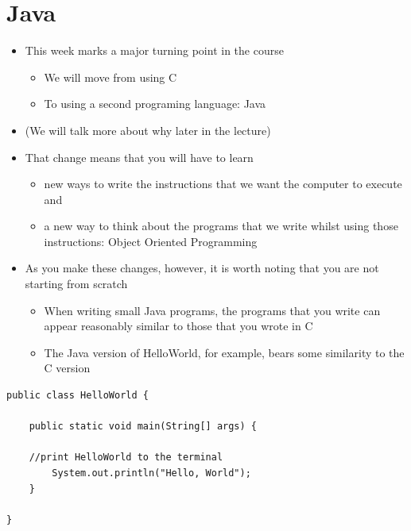 \documentclass{beamer}
\begin{document}
\section{Java}
\begin{frame}{}
\begin{itemize}
\item This week marks a major turning point in the course
\begin{itemize}
\item We will move from using C
\item To using a second programing language: Java
\end{itemize}
\item (We will talk more about why later in the lecture)
\end{itemize}\end{frame}\begin{frame}\begin{itemize}

\item That change means that you will have to learn
\begin{itemize}
\item new ways to write the instructions that we want the computer to execute and
\item a new way to think about the programs that we write whilst using
those instructions: Object Oriented Programming
\end{itemize}
\end{itemize}\end{frame}

\begin{frame}\begin{itemize}

\item As you make these changes, however, it is worth noting that you are
not starting from scratch

\begin{itemize}
\item When writing small Java programs, the programs that you write can appear reasonably
similar to those that you wrote in C
\item The Java version of HelloWorld, for example, bears some similarity
to the C version

\end{itemize}
\end{itemize}\end{frame}

\begin{frame}[fragile]
\begin{block}{}
\begin{lstlisting}
public class HelloWorld {

    public static void main(String[] args) {
        
	//print HelloWorld to the terminal
        System.out.println("Hello, World");
    }

}
\end{lstlisting}
\end{block}
\end{frame}
\end{document}

